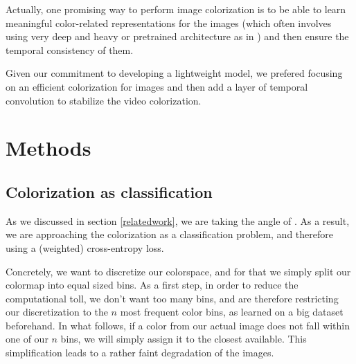 \documentclass[10pt,twocolumn,letterpaper]{article}
\begin{document}
Actually, one promising way to perform image colorization is to be able to learn meaningful color-related representations for the images (which often involves using very deep and heavy or pretrained architecture as in \cite{larsson2016repres}) and then ensure the temporal consistency of them.

Given our commitment to developing a lightweight model, we prefered focusing on an efficient colorization for images and then add a layer of temporal convolution to stabilize the video colorization.


\section{Methods} \label{methods}

\subsection{Colorization as classification}

As we discussed in section \ref{relatedwork}, we are taking the angle of \cite{zhang2016colorful}. As a result, we are approaching the colorization as a classification problem, and therefore using a (weighted) cross-entropy loss.

Concretely, we want to discretize our colorspace, and for that we simply split our colormap into equal sized bins. As a first step, in order to reduce the computational toll, we don't want too many bins, and are therefore restricting our discretization to the $n$ most frequent color bins, as learned on a big dataset beforehand. In what follows, if a color from our actual image does not fall within one of our $n$ bins, we will simply assign it to the closest available. This simplification leads to a rather faint degradation of the images.
\end{document}
